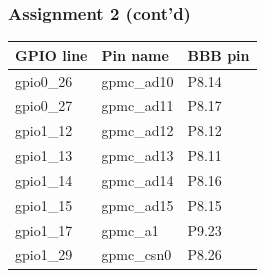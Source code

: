 \begin{frame}
  \frametitle{Assignment 2 (cont'd)}
      \begin{table}
        \begin{tabular}{| l | l | l |}
          \toprule
          GPIO line & Pin name & BBB pin      \\
          \midrule
          gpio0\_26 & gpmc\_ad10 & P8.14      \\
          gpio0\_27 & gpmc\_ad11 & P8.17      \\
          gpio1\_12 & gpmc\_ad12 & P8.12      \\
          gpio1\_13 & gpmc\_ad13 & P8.11      \\
          gpio1\_14 & gpmc\_ad14 & P8.16      \\
          gpio1\_15 & gpmc\_ad15 & P8.15      \\
          gpio1\_17 & gpmc\_a1   & P9.23      \\
          gpio1\_29 & gpmc\_csn0 & P8.26      \\
          \bottomrule
        \end{tabular}
      \end{table}
\end{frame}

